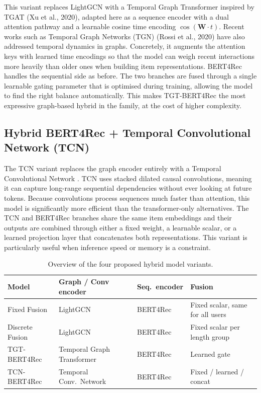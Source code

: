 \documentclass[12pt,a4paper]{report}
\begin{document}
\justifying
This variant replaces LightGCN with a Temporal Graph Transformer inspired by
TGAT (Xu et al., 2020), adapted here as a sequence encoder with a dual
attention pathway and a learnable cosine time encoding
$\cos(\mathbf{W} \cdot t)$. Recent works such as Temporal Graph Networks (TGN) (Rossi et al., 2020) have also addressed temporal dynamics in graphs. Concretely, it augments the attention keys with learned time encodings
so that the model can weigh recent interactions more heavily than older ones
when building item representations. BERT4Rec handles the sequential side as
before. The two branches are fused through a single learnable gating parameter
that is optimised during training, allowing the model to find the right balance
automatically. This makes TGT-BERT4Rec the most expressive graph-based hybrid
in the family, at the cost of higher complexity.

\subsection{Hybrid BERT4Rec + Temporal Convolutional Network (TCN)}
\label{sec:tcn}

\justifying
The TCN variant replaces the graph encoder entirely with a Temporal
Convolutional Network \citep{bai2018tcn}. TCN uses stacked dilated causal
convolutions, meaning it can capture long-range sequential dependencies without
ever looking at future tokens. Because convolutions process sequences much faster
than attention, this model is significantly more efficient than the
transformer-only alternatives. The TCN and BERT4Rec branches share the same
item embeddings and their outputs are combined through either a fixed weight, a
learnable scalar, or a learned projection layer that concatenates both
representations. This variant is particularly useful when inference speed or
memory is a constraint.

\begin{table}[h]
\centering
\caption{Overview of the four proposed hybrid model variants.}
\label{tab:model_family}
\begin{tabular}{p{3.8cm} p{3.2cm} p{2.8cm} p{3.0cm}}
\toprule
\textbf{Model} & \textbf{Graph / Conv encoder} & \textbf{Seq.\ encoder} & \textbf{Fusion} \\
\midrule
Fixed Fusion       & LightGCN   & BERT4Rec & Fixed scalar, same for all users \\[3pt]
Discrete Fusion    & LightGCN   & BERT4Rec & Fixed scalar per length group \\[3pt]
TGT-BERT4Rec       & Temporal Graph Transformer & BERT4Rec & Learned gate \\[3pt]
TCN-BERT4Rec       & Temporal Conv.\ Network & BERT4Rec & Fixed / learned / concat \\
\bottomrule
\end{tabular}
\end{table}
\end{document}
